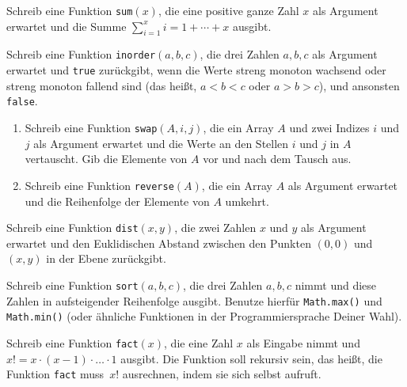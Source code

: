 \documentclass{uebung_cs}
\begin{document}
\begin{aufgabe}[Summe]
    Schreib eine Funktion \texttt{sum}$(x)$, die eine positive ganze Zahl $x$ als Argument erwartet und die Summe $\sum_{i=1}^x i = 1+\cdots+x$ ausgibt.
\end{aufgabe}

\begin{aufgabe}
    Schreib eine Funktion \texttt{inorder}$(a,b,c)$, die drei Zahlen $a,b,c$ als Argument erwartet und \texttt{true} zurückgibt, wenn die Werte streng monoton wachsend oder streng monoton fallend sind (das heißt, $a<b<c$ oder $a>b>c$), und ansonsten \texttt{false}.
\end{aufgabe}

\begin{aufgabe}\mbox{}
    \begin{enumerate}
        \item Schreib eine Funktion \texttt{swap}$(A,i,j)$, die ein Array $A$ und zwei Indizes $i$ und $j$ als Argument erwartet und die Werte an den Stellen $i$ und $j$ in $A$ vertauscht. Gib die Elemente von $A$ vor und nach dem Tausch aus.
        \item Schreib eine Funktion \texttt{reverse}$(A)$, die ein Array $A$ als Argument erwartet und die Reihenfolge der Elemente von $A$ umkehrt.
    \end{enumerate}
\end{aufgabe}

\begin{aufgabe}[Abstand]
    Schreib eine Funktion \texttt{dist}$(x,y)$, die zwei Zahlen $x$ und $y$ als Argument erwartet und den Euklidischen Abstand zwischen den Punkten $(0,0)$ und $(x,y)$ in der Ebene zurückgibt.
\end{aufgabe}

\begin{aufgabe}
    Schreib eine Funktion \texttt{sort}$(a,b,c)$, die drei Zahlen $a,b,c$ nimmt und diese Zahlen in aufsteigender Reihenfolge ausgibt. Benutze hierfür \texttt{Math.max()} und \texttt{Math.min()} (oder ähnliche Funktionen in der Programmiersprache Deiner Wahl).
\end{aufgabe}

\begin{aufgabe}[Fakultät]
    Schreib eine Funktion \texttt{fact}$(x)$, die eine Zahl $x$ als Eingabe nimmt und $x!=x\cdot (x-1)\cdot\ldots\cdot 1$ ausgibt.
    Die Funktion soll rekursiv sein, das heißt, die Funktion \texttt{fact} muss~$x!$ ausrechnen, indem sie sich selbst aufruft.
\end{aufgabe}
\end{document}
